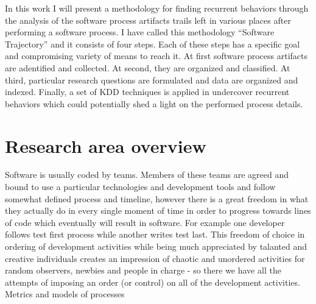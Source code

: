 In this work I will present a methodology for finding recurrent behaviors through the analysis of the software process artifacts trails left in various places after performing a software process. I have called this methodology ``Software Trajectory'' and it consists of four steps. Each of these steps has a specific goal and compromising variety of means to reach it. At first software process artifacts are adentified and collected. At second, they are organized and classified. At third, particular research questions are formulated and data are organized and indexed. Finally, a set of KDD techniques is applied in undercover recurrent behaviors which could potentially shed a light on the performed process details. 

\section{Research area overview}
Software is usually coded by teams. Members of these teams are agreed and bound to use a particular technologies and development tools and follow 
somewhat defined process and timeline, however there is a great freedom in what they actually do in every single moment of time in order to progress 
towards lines of code which eventually will result in software. For example one developer follows test first process while another writes test last. 
This freedom of choice in ordering of development activities while being much appreciated by talanted and creative individuals creates an impression 
of chaotic and unordered activities for random observers, newbies and people in charge - so there we have all the attempts of imposing an order 
(or control) on all of the development activities. Metrics and models of processes




